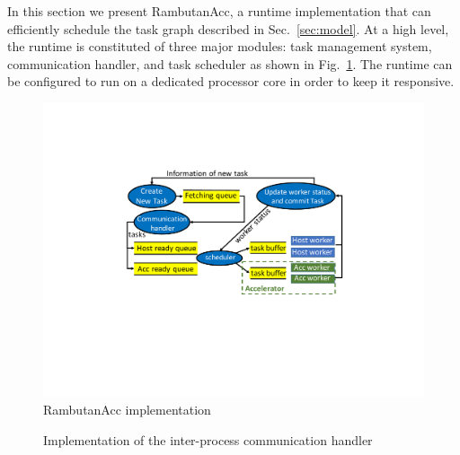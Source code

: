 In this section we present RambutanAcc, a runtime implementation that can efficiently schedule the task graph described in Sec.~\ref{sec:model}.
At a high level, the runtime is constituted of three major modules: task management system, communication handler, and task scheduler as shown in Fig.~\ref{fig:impl}. 
The runtime can be configured to run on a dedicated processor core in order to keep it responsive.

\begin{figure}[htb]
\centering
\includegraphics[width=.7\textwidth]{figures/impl.pdf}
\caption{RambutanAcc implementation}
\label{fig:impl}
\end{figure}


\begin{figure}[htb]
\centering
{}\hspace{1cm}
\caption{Implementation of the inter-process communication handler}
\end{figure}


